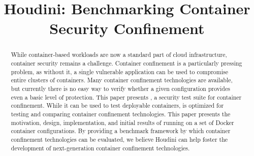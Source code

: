\documentclass[conference]{IEEEtran}
\begin{document}
\newcommand{\cmark}{\textcolor{green}{\ding{51}}}  %
\newcommand{\xmark}{\textcolor{red}{\ding{55}}}    %


\title{Houdini: Benchmarking Container\\ Security Confinement}

\author{
\and
{}
\and
{}
}


\maketitle
\thispagestyle{plain}
\pagestyle{plain}
\begin{abstract}
  While container-based workloads are now a standard part of cloud infrastructure, container security remains a challenge. Container confinement is a particularly pressing problem, as without it, a single vulnerable application can be used to compromise entire clusters of containers. Many container confinement technologies are available, but currently there is no easy way to verify whether a given configuration provides even a basic level of protection. This paper presents \houdini, a security test suite for container confinement. While it can be used to test deployable containers, \houdini is optimized for testing and comparing container confinement technologies. This paper presents the motivation, design, implementation, and initial results of running \houdini on a set of Docker container configurations. By providing a benchmark framework by which container confinement technologies can be evaluated, we believe Houdini can help foster the development of next-generation container confinement technologies.
\end{abstract}














\end{document}
